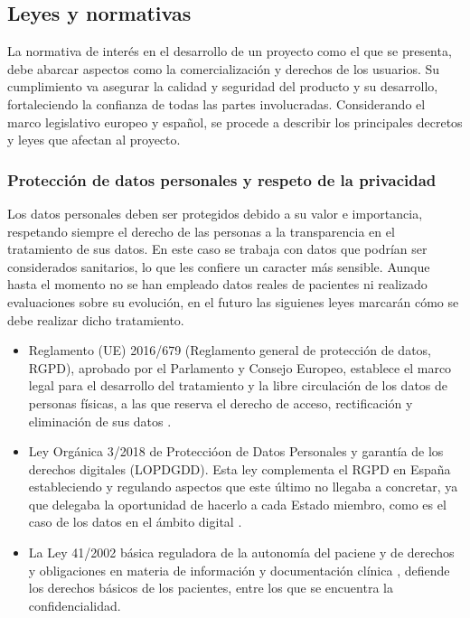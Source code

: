 \subsection{Leyes y normativas}
 La normativa de interés en el desarrollo de un proyecto como el que se presenta, debe abarcar aspectos como la comercialización y derechos de los usuarios. Su cumplimiento va asegurar la calidad y seguridad del producto y su desarrollo, fortaleciendo la confianza de todas las partes involucradas.
Considerando el marco legislativo europeo y español, se procede a describir los principales decretos y leyes que afectan al proyecto.

\subsubsection{Protección de datos personales y respeto de la privacidad}
Los datos personales deben ser protegidos debido a su valor e importancia, respetando siempre el derecho de las personas a la transparencia en el tratamiento de sus datos. En este caso se trabaja con datos que podrían ser considerados sanitarios, lo que les confiere un caracter más sensible. Aunque hasta el momento no se han empleado datos reales de pacientes ni realizado evaluaciones sobre su evolución, en el futuro las siguienes leyes marcarán cómo se debe realizar dicho tratamiento.

\begin{itemize}
    \item Reglamento (UE) 2016/679 (Reglamento general de protección de datos, RGPD), aprobado por el Parlamento y Consejo Europeo, establece el marco legal para el desarrollo del tratamiento y la libre circulación de los datos de personas físicas, a las que reserva el derecho de acceso, rectificación y eliminación de sus datos \cite{BOE_RGPD:online}.
    \item Ley Orgánica 3/2018 de Proteccióon de Datos Personales y garantía de los derechos digitales (LOPDGDD). Esta ley complementa el RGPD en España estableciendo y regulando aspectos que este último no llegaba a concretar, ya que delegaba la oportunidad de hacerlo a cada Estado miembro, como es el caso de los datos en el ámbito digital\cite{BOE_LOPDGDD:online} \cite{BOE_RGPD:online}.
    \item La Ley 41/2002 básica reguladora de la autonomía del paciene y de derechos y obligaciones en materia de información y documentación clínica \cite{BOE_41/2002:online}, defiende los derechos básicos de los pacientes, entre los que se encuentra la confidencialidad.
\end{itemize}

